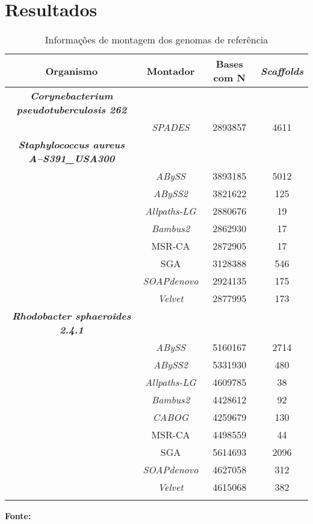 \chapter{Resultados}
\label{cap:resultados}

\begin{table}[!htb]
\centering
\caption{Informações de montagem dos genomas de referência}
\label{tab:informacoes_montagem}
\begin{tabular}{cccc}
\toprule
\textbf{Organismo} & \textbf{Montador} & \textbf{Bases com N} & \textbf{\textit{Scaffolds}} \\ \midrule
\rowcolor[HTML]{F3F3F3} 
\textbf{\textit{Corynebacterium pseudotuberculosis 262}} & & & \\
\rowcolor[HTML]{DBDEDE} 
 & \textit{SPADES} & 2893857 & 4611 \\
\rowcolor[HTML]{F3F3F3} 
\textbf{\textit{Staphylococcus aureus A--S391\_USA300}} & & & \\
\rowcolor[HTML]{DBDEDE} 
 & \textit{ABySS} & 3893185 & 5012 \\
\rowcolor[HTML]{F3F3F3} 
 & \textit{ABySS2} & 3821622 & 125 \\
\rowcolor[HTML]{DBDEDE} 
 & \textit{Allpaths-LG} & 2880676 & 19 \\
\rowcolor[HTML]{F3F3F3} 
 & \textit{Bambus2} & 2862930 & 17 \\
\rowcolor[HTML]{DBDEDE} 
 & MSR-CA & 2872905 & 17 \\
\rowcolor[HTML]{F3F3F3} 
 & SGA & 3128388 & 546 \\
\rowcolor[HTML]{DBDEDE} 
 & \textit{SOAPdenovo} & 2924135 & 175 \\
\rowcolor[HTML]{F3F3F3} 
 & \textit{Velvet} & 2877995 & 173 \\
\rowcolor[HTML]{DBDEDE} 
\textbf{\textit{Rhodobacter sphaeroides 2.4.1}} & & & \\
\rowcolor[HTML]{F3F3F3} 
 & \textit{ABySS} & 5160167 & 2714 \\
\rowcolor[HTML]{DBDEDE} 
 & \textit{ABySS2} & 5331930 & 480 \\
\rowcolor[HTML]{F3F3F3} 
 & \textit{Allpaths-LG} & 4609785 & 38 \\
\rowcolor[HTML]{DBDEDE} 
 & \textit{Bambus2} & 4428612 & 92 \\
\rowcolor[HTML]{F3F3F3} 
 & \textit{CABOG} & 4259679 & 130 \\
\rowcolor[HTML]{DBDEDE} 
 & MSR-CA & 4498559 & 44 \\
\rowcolor[HTML]{F3F3F3} 
 & SGA & 5614693 & 2096 \\
\rowcolor[HTML]{DBDEDE} 
 & \textit{SOAPdenovo} & 4627058 & 312 \\
\rowcolor[HTML]{F3F3F3} 
 & \textit{Velvet} & 4615068 & 382 \\ \bottomrule \\
\end{tabular}
\begin{small}\textbf{Fonte: }\end{small}
\end{table}


